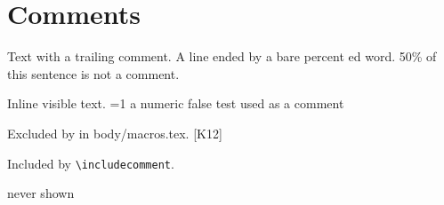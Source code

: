 \section{Comments}
Text with a trailing comment. %
A line ended by a bare percent%
ed word.
%
50\% of this sentence is not a comment. %
% 
%  
\iffalse
  \section{Dropped}
  
  \begin{itemize}
  $A \iff B$ \undefinedcommand
  \ifnum1=1 nested and balanced \fi
\fi
Inline visible text.%
=1 a numeric false test used as a comment \fi%

\begin{gmhidden}
Excluded by \excludecomment in body/macros.tex. [K12]
\end{gmhidden}
\begin{gmshown}
Included by \verb|\includecomment|.
\end{gmshown}
\ifgmcomments never shown\fi
